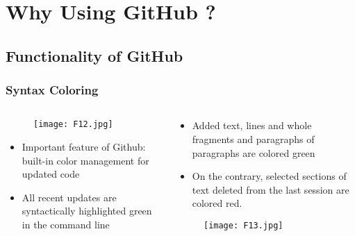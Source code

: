 \documentclass[pdflatex,compress,8pt,
	xcolor={dvipsnames,dvipsnames,svgnames,x11names,table},
	hyperref={
	breaklinks = true, 
	pdfauthor={Lemenkova Polina}, 
	pdfsubject={Preentation}, 
	pdfcreator={Lemenkova Polina}, 
	pdfproducer={Lemenkova Polina}, 
	colorlinks=true,linkcolor=blue, 
	citecolor=NavyBlue, 
	urlcolor = NavyBlue, 
	breaklinks = true}]{beamer}
\begin{document}
\section{Why Using GitHub ?}
\subsection{Functionality of GitHub}
\begin{frame}\frametitle{Syntax Coloring}
\begin{minipage}[0.4\textheight]{\textwidth}
\begin{columns}[T]
\begin{column}{0.5\textwidth}
\vspace{1em}
\begin{figure}[H]
	\centering
		\texttt{[image: F12.jpg]}
\end{figure}
\begin{itemize}
	\item Important feature of Github: built-in color management for updated code
	\item All recent updates are syntactically highlighted green in the command line
\end{itemize}
\end{column}
\begin{column}{0.5\textwidth}
\vspace{1em} 
\begin{itemize}
	\item Added text, lines and whole fragments and paragraphs of paragraphs are colored green
	\item On the contrary, selected sections of text deleted from the last session are colored red.
\end{itemize}
\begin{figure}[H]
	\centering
		\texttt{[image: F13.jpg]}
\end{figure}
\end{column}
\end{columns}
\end{minipage}
\end{frame}
\end{document}
